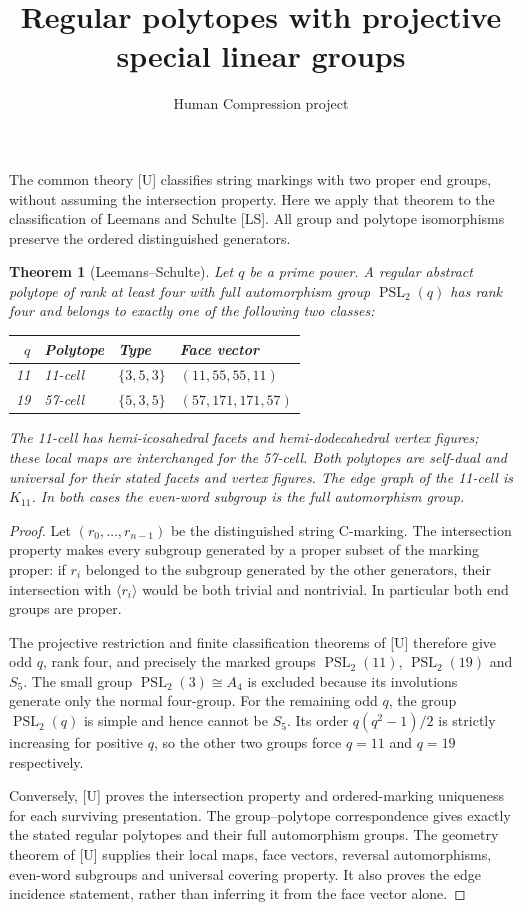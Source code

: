 \documentclass[11pt,a4paper]{article}
\title{Regular polytopes with projective special linear groups}
\author{Human Compression project}
\date{}
\newtheorem{theorem}{Theorem}
\begin{document}
\maketitle

The common theory [U] classifies string markings with two proper end
groups, without assuming the intersection property. Here we apply that
theorem to the classification of Leemans and Schulte [LS]. All group and
polytope isomorphisms preserve the ordered distinguished generators.

\begin{theorem}[Leemans--Schulte]
Let $q$ be a prime power. A regular abstract polytope of rank at least
four with full automorphism group $\operatorname{PSL}_2(q)$ has rank four
and belongs to exactly one of the following two classes:
\begin{center}
\begin{tabular}{rlll}
\toprule
$q$ & Polytope & Type & Face vector\\
\midrule
11 & 11-cell & $\{3,5,3\}$ & $(11,55,55,11)$\\
19 & 57-cell & $\{5,3,5\}$ & $(57,171,171,57)$\\
\bottomrule
\end{tabular}
\end{center}
The 11-cell has hemi-icosahedral facets and hemi-dodecahedral vertex
figures; these local maps are interchanged for the 57-cell. Both polytopes
are self-dual and universal for their stated facets and vertex figures.
The edge graph of the 11-cell is $K_{11}$. In both cases the even-word
subgroup is the full automorphism group.
\end{theorem}

\begin{proof}
Let $(r_0,\ldots,r_{n-1})$ be the distinguished string C-marking.
The intersection property makes every subgroup generated by a proper
subset of the marking proper: if $r_i$ belonged to the subgroup
generated by the other generators, their intersection with
$\langle r_i\rangle$ would be both trivial and nontrivial.
In particular both end groups are proper.

The projective restriction and finite classification theorems of [U]
therefore give odd $q$, rank four, and precisely the marked groups
$\operatorname{PSL}_2(11)$, $\operatorname{PSL}_2(19)$ and $S_5$.
The small group $\operatorname{PSL}_2(3)\cong A_4$ is excluded because
its involutions generate only the normal four-group. For the remaining
odd $q$, the group $\operatorname{PSL}_2(q)$ is simple and hence cannot
be $S_5$. Its order $q(q^2-1)/2$ is strictly increasing for positive
$q$, so the other two groups force $q=11$ and $q=19$ respectively.

Conversely, [U] proves the intersection property and ordered-marking
uniqueness for each surviving presentation. The group--polytope
correspondence gives exactly the stated regular polytopes and their
full automorphism groups. The geometry theorem of [U] supplies their
local maps, face vectors, reversal automorphisms, even-word subgroups
and universal covering property. It also proves the edge incidence
statement, rather than inferring it from the face vector alone.
\end{proof}
\end{document}
